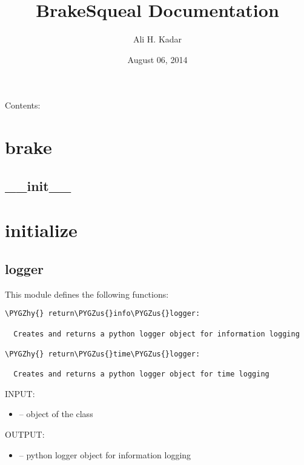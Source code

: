 \documentclass[letterpaper,10pt,english]{sphinxmanual}
\title{BrakeSqueal Documentation}
\date{August 06, 2014}
\author{Ali H. Kadar}
\def\PYGZus{\char`\_}
\def\PYGZhy{\char`\-}
\begin{document}
\maketitle
\tableofcontents
{}\label{index::doc}


Contents:


\chapter{brake}
\label{index:brake}\label{index:welcome-to-brakesqueal-s-documentation}

\section{\_\_init\_\_}
\label{index:init}\label{index:module-__init__}

\chapter{initialize}
\label{index:initialize}

\section{logger}
\label{index:logger}\label{index:module-logger}
This module defines the following functions:

\begin{Verbatim}[commandchars=\\\{\}]
\PYGZhy{} return\PYGZus{}info\PYGZus{}logger:
  
  Creates and returns a python logger object for information logging
  
\PYGZhy{} return\PYGZus{}time\PYGZus{}logger:
  
  Creates and returns a python logger object for time logging
\end{Verbatim}

\begin{fulllineitems}
\label{index:logger.return_info_logger}
INPUT:
\begin{itemize}
\item {} 
 -- object of the class 

\end{itemize}

OUTPUT:
\begin{itemize}
\item {} 
 -- python logger object for information logging

\end{itemize}

\end{fulllineitems}
\end{document}
